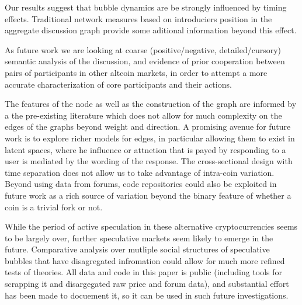 Our results suggest that bubble dynamics are be strongly influenced by timing effects. Traditional network measures based on introduciers position in the aggregate discussion graph provide some aditional  information beyond this effect.

As future work we are looking at coarse (positive/negative, detailed/cursory) semantic analysis of the discussion, and evidence of prior cooperation between pairs of participants in other altcoin markets, in order to attempt a more accurate characterization of core participants and their actions.

The features of the node as well as the construction of the graph are informed by a the pre-existing literature which does not allow for much complexity on the edges of the graphs beyond weight and direction.
A promising avenue for future work is to explore richer models for edges, in particular allowing them to exist in latent spaces, where he influence or attnetion that is payed by responding to a user is mediated by the wording of the response. 
The cross-sectional design with time separation does not allow us to take advantage of intra-coin variation.
Beyond using data from forums, code repositories could also be exploited in future work as a rich source of variation beyond the binary feature of whether a coin is a trivial fork or not.

While the period of active speculation in these alternative cryptocurrencies seems to be largely over, further speculative markets seem likely to emerge in the future. Comparative analysis over mutliple social structures of speculative bubbles that have disagregated infromation could allow for much more refined tests of theories. 
All data and code in this paper is public (including tools for scrapping it and disargegated raw price and forum data), and substantial effort has been made to docuement it, so it can be used in such future investigations. 
